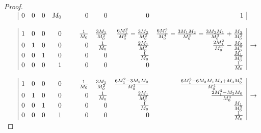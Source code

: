 \begin{proof}
\begin{math}
\begin{array}{rr|rrrr@{\hspace{3ex}\hspace{3ex}}rrrr|c}
    &&   0 &     0 &     0 &  M_0  & 0 & 0                &  0                                    & 1                                                                                  &               
    \\ \\
    &&   1 &     0 &     0 &    0  & \frac{1}{M_0} & \frac{3M_1}{M_0^2} & \frac{6M_1^2}{M_0^3}-\frac{3M_2}{M_0^2} & \frac{6M_1^3}{M_0^4}-\frac{3M_1M_2}{M_0^3} - \frac{3M_2M_1}{M_0^3}+\frac{M_3}{M_0^2} &             \\
    &&   0 &     1 &     0 &    0  & 0 & \frac{1}{M_0}    &  \frac{2M_1}{M_0^2}                     & \frac{2M_1^2}{M_0^3}-\frac{M_2}{M_0^2}                                                             & \rightarrow \\
    &&   0 &     0 &     1 &    0  & 0 & 0                &  \frac{1}{M_0}                          & \frac{M_1}{M_0^2}                                                                                  &             \\
    &&   0 &     0 &     0 &    1  & 0 & 0                &  0                                    & \frac{1}{M_0}                                                                                        &               
    \\ \\
    &&   1 &     0 &     0 &    0  & \frac{1}{M_0} & \frac{3M_1}{M_0^2} & \frac{6M_1^2-3M_2M_0}{M_0^3} & \frac{6M_1^3-6M_2M_1M_0+M_3M_0^2}{M_0^4}  &             \\
    &&   0 &     1 &     0 &    0  & 0 & \frac{1}{M_0}    &  \frac{2M_1}{M_0^2}                     & \frac{2M_1^2-M_2M_0}{M_0^3}                  & \rightarrow \\
    &&   0 &     0 &     1 &    0  & 0 & 0                &  \frac{1}{M_0}                          & \frac{M_1}{M_0^2}                            &             \\
    &&   0 &     0 &     0 &    1  & 0 & 0                &  0                                    & \frac{1}{M_0}                                  &             
  \end{array}
\end{math}


\end{proof}
